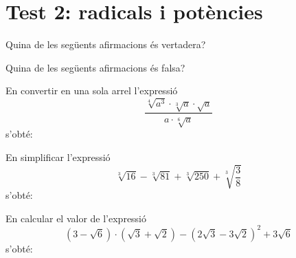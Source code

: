 \section{Test 2: radicals i potències}

\begin{enumerate}
\pregunta Quina de les següents afirmacions és vertadera?

\begin{enumerate}
\end{enumerate}
\feedback


\pregunta Quina de les següents afirmacions és falsa?

\begin{enumerate}
\end{enumerate}
\feedback


\pregunta En convertir en una sola arrel l’expressió%
\[
\frac{\sqrt[4]{a^{3}}\cdot \sqrt[3]{a}\cdot \sqrt{a}}{a\cdot \sqrt[6]{a}}
\]%
s’obté:

\begin{enumerate}
\end{enumerate}
\feedback


\pregunta En simplificar l’expressió%
\[
\sqrt[3]{16}-\sqrt[3]{81}+\sqrt[3]{250}+\sqrt[3]{\frac{3}{8}}
\]%
s’obté:

\begin{enumerate}
\end{enumerate}
\feedback


\pregunta En calcular el valor de l’expressió%
\[
(3-\sqrt{6})\cdot (\sqrt{3}+\sqrt{2})-(2\sqrt{3}-3\sqrt{2})^{2}+3\sqrt{6}
\]%
s’obté:

\begin{enumerate}
\end{enumerate}
\feedback



\end{enumerate}
